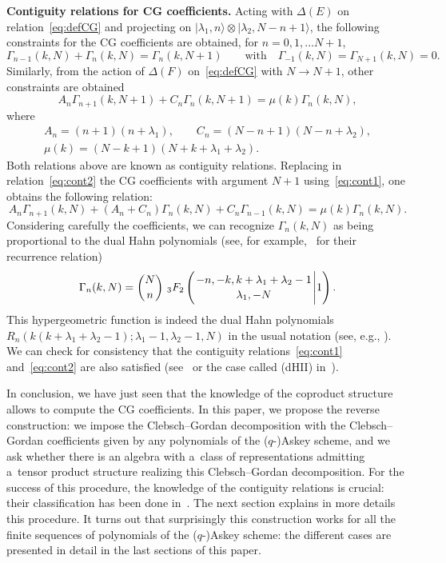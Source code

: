 \documentclass[10pt,a4paper]{amsart}
\numberwithin{equation}{section}
\theoremstyle{definition}
\begin{document}
{\bf Contiguity relations for CG coefficients.}
Acting with $\Delta(E)$ on relation~\eqref{eq:defCG} and projecting on $|\lambda_1,n\rangle\otimes |\lambda_2,N-n+1\rangle$, the following constraints for the CG coefficients are obtained, for $n=0,1,\dots N+1$,
\begin{equation}\label{eq:cont1}
 \Gamma_{n-1}(k,N)+\Gamma_n(k,N)=\Gamma_n(k,N+1) \qquad \text{with} \quad\Gamma_{-1}(k,N)=\Gamma_{N+1}(k,N)=0.
\end{equation}
Similarly, from the action of $\Delta(F)$ on~\eqref{eq:defCG} with $N\to N+1$, other constraints are obtained
\begin{equation}\label{eq:cont2}
 A_n \Gamma_{n+1}(k,N+1)+C_n \Gamma_n(k,N+1)=\mu(k)\Gamma_n(k,N),
\end{equation}
where
\begin{gather*}
A_n= (n+1)(n+\lambda_1),\qquad C_n=(N-n+1)(N-n+\lambda_2),\\ \mu(k)=(N-k+1)(N+k+\lambda_1+\lambda_2).
\end{gather*}
Both relations above are known as contiguity relations. Replacing in relation~\eqref{eq:cont2} the CG coefficients with argument $N+1$ using~\eqref{eq:cont1}, one obtains the following relation:
\[ A_n \Gamma_{n+1}(k,N)+(A_n+C_n)\Gamma_{n}(k,N)+C_n \Gamma_{n-1}(k,N)=\mu(k)\Gamma_n(k,N).\]
Considering carefully the coefficients, we can recognize $\Gamma_n(k,N)$ as being proportional to the dual Hahn polynomials (see, for example,~\cite{KLS10} for their recurrence relation)
\[
 \Gamma_n(k,N)=\binom{N}{n}\ {}_3F_2 \left({{-n, -k, k+\lambda_1+\lambda_2-1}\atop
{\lambda_1, -N}} \Bigg\vert  1\right).
\]
This hypergeometric function is indeed the dual Hahn polynomials $R_n(k(k+\lambda_1+\lambda_2-1);\allowbreak{\lambda_1-1},\lambda_2-1,N)$ in the usual notation (see, e.g., \cite{KLS10}).
We can check for consistency that the contiguity relations~\eqref{eq:cont1} and~\eqref{eq:cont2} are also satisfied (see~\cite{OV16} or the case called (dHII) in~\cite{contiguity}).

In conclusion, we have just seen that
the knowledge of the coproduct structure allows to compute the CG coefficients.
In this paper, we propose the reverse construction: we impose the Clebsch--Gordan decomposition with the Clebsch--Gordan coefficients given by any polynomials of the ($q$-)Askey scheme, and we ask whether there is an algebra with a~class of representations admitting a~tensor product structure realizing this Clebsch--Gordan decomposition. For the success of this procedure, the knowledge of the contiguity relations is crucial: their classification has been done in~\cite{contiguity}.
The next section explains in more details this procedure.
It turns out that surprisingly this construction works for all the finite sequences of polynomials of the ($q$-)Askey scheme: the different cases are presented in detail in the last sections of this paper.
\end{document}
